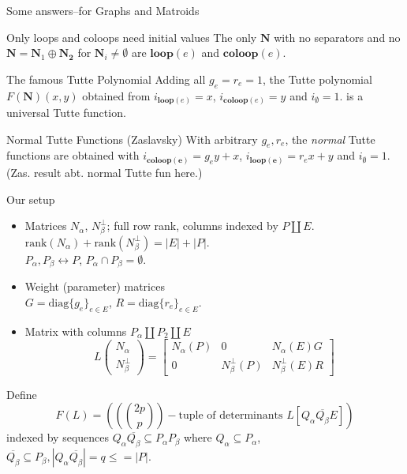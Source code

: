 \documentclass{beamer}
\newcommand{\dunion}{\coprod}
\newcommand{\ext}[1]{\ensuremath{\mathbf{#1}}}
\begin{document}
\begin{frame}{Some answers--for Graphs and Matroids}

  \begin{block}{Only loops and coloops need initial values}
    The only
    $\ext{N}$ with no separators and no $\ext{N}=\ext{N}_1\oplus\ext{N_2}$
    for $\ext{N}_i\neq\emptyset$ are $\mathbf{loop}(e)$
    and $\mathbf{coloop}(e)$.
  \end{block}


  \begin{block}{The famous Tutte Polynomial}
  Adding all $g_e=r_e=1$, the Tutte polynomial $F(\ext{N})(x,y)$
  obtained from $i_{\mathbf{loop}(e)}=x$, 
  $i_{\mathbf{coloop}(e)}=y$ and $i_{\mathbf{\emptyset}}=1$.
  is a universal Tutte function.
  \end{block}
  
  \begin{block}{Normal Tutte Functions}
    (Zaslavsky) With arbitrary $g_e,r_e$, the \emph{normal} Tutte functions are
  obtained with $i_{\mathbf{coloop(e)}}=g_ey + x$,
  $i_{\mathbf{loop(e)}}=r_ex + y$ and  $i_{\mathbf{\emptyset}}=1$.
  (Zas. result abt. normal Tutte fun here.)
  \end{block}

\end{frame}

      
\newcommand{\Nal}{\ensuremath{N_{\alpha}}}
\newcommand{\NbePe}{\ensuremath{N_{\beta}^{\perp}}}
\newcommand{\eNal}{\ensuremath{\ext{N}_{\alpha}}}
\newcommand{\eNbePe}{\ensuremath{\ext{N}_{\beta}^{\perp}}}


\begin{frame}{Our setup}
  \begin{itemize}
  \item
    Matrices $\Nal$, $\NbePe$; full row rank, columns indexed by
    $P\dunion E$. $\text{rank}(\Nal)+\text{rank}(\NbePe)=|E|+|P|$.\\
    $P_{\alpha},P_{\beta}\leftrightarrow P$, $P_{\alpha}\cap P_{\beta}=\emptyset$.
  \item
    Weight (parameter) matrices\\
    $G=\text{diag}\{g_e\}_{e\in E} $,
    $R=\text{diag}\{r_e\}_{e\in E} $.
  \item
    Matrix with columns $P_\alpha \dunion P_2 \dunion E$
    \[
    L\left( \begin{array}{c} \Nal\\ \NbePe \end{array} \right)
    = \left[\begin{array}{c|c|c} \Nal(P)  &  0  &  \Nal(E)G \\  \hline
0  & \NbePe(P)  &  \NbePe(E)R \end{array}\right]
    \]
  \end{itemize}

  Define
  \[
  F(L)=((\binom{2p}{p})-\text{tuple of determinants\ } L[Q_\alpha \overline{Q_\beta} E])
  \]
  indexed by sequences $Q_\alpha \overline{Q_\beta} \subseteq P_\alpha P_\beta$ where
  $Q_\alpha\subseteq P_\alpha$, $\overline{Q_\beta}\subseteq P_\beta, |Q_\alpha \overline{Q_\beta}|= q \le = |P|$.
    
\end{frame}
\end{document}
